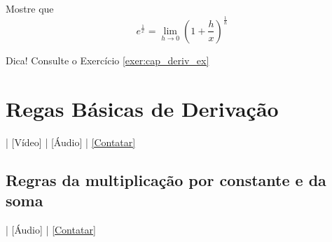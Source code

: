 \begin{exer}\label{exer:cap_deriv_defe1ox}
  Mostre que
  \begin{equation}
    e^{\frac{1}{x}} = \lim_{h\to 0}\left(1 + \frac{h}{x}\right)^{\frac{1}{h}}
  \end{equation}
\end{exer}
\begin{resp}
  Dica! Consulte o Exercício \ref{exer:cap_deriv_ex}
\end{resp}

\section{Regas Básicas de Derivação}\label{cap_deriv_sec_regrasderiv}

\begin{flushright}
  [YouTube] | [Vídeo] | [Áudio] | \href{https://phkonzen.github.io/notas/contato.html}{[Contatar]}
\end{flushright}

\subsection{Regras da multiplicação por constante e da soma}\label{subsec:deriv_rmcs}

\begin{flushright}
  [Vídeo] | [Áudio] | \href{https://phkonzen.github.io/notas/contato.html}{[Contatar]}
\end{flushright}

